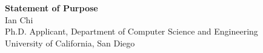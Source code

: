 \documentclass[11pt]{article}
\begin{document}
\begin{center}
    {\Large \textbf{Statement of Purpose}}\\[4pt]
    {\large Ian Chi}\\[2pt]
    Ph.D. Applicant, Department of Computer Science and Engineering\\
    University of California, San Diego
\end{center}

\vspace{1em}

\end{document}

